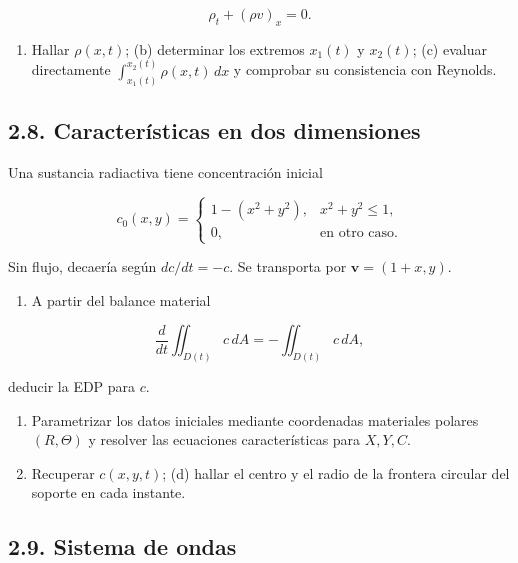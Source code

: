 \documentclass[11pt,a4paper]{article}
\providecommand{\tightlist}{\setlength{\itemsep}{0pt}\setlength{\parskip}{0pt}}
\begin{document}
\[\rho_t+(\rho v)_x=0.\]

\begin{enumerate}
\def\labelenumi{(\alph{enumi})}
\tightlist
\item
  Hallar \(\rho(x,t)\); (b) determinar los extremos \(x_1(t)\) y
  \(x_2(t)\); (c) evaluar directamente
  \(\int_{x_1(t)}^{x_2(t)}\rho(x,t)\,dx\) y comprobar su consistencia
  con Reynolds.
\end{enumerate}

\hypertarget{caracteruxedsticas-en-dos-dimensiones}{%
\subsection{2.8. Características en dos
dimensiones}\label{caracteruxedsticas-en-dos-dimensiones}}

Una sustancia radiactiva tiene concentración inicial

\[c_0(x,y)=\begin{cases}1-(x^2+y^2),&x^2+y^2\le1,\\0,&\text{en otro caso}.\end{cases}\]

Sin flujo, decaería según \(dc/dt=-c\). Se transporta por
\(\mathbf v=(1+x,y)\).

\begin{enumerate}
\def\labelenumi{(\alph{enumi})}
\tightlist
\item
  A partir del balance material
\end{enumerate}

\[\frac{d}{dt}\iint_{D(t)}c\,dA=-\iint_{D(t)}c\,dA,\]

deducir la EDP para \(c\).

\begin{enumerate}
\def\labelenumi{(\alph{enumi})}
\setcounter{enumi}{1}
\item
  Parametrizar los datos iniciales mediante coordenadas materiales
  polares \((R,\Theta)\) y resolver las ecuaciones características para
  \(X,Y,C\).
\item
  Recuperar \(c(x,y,t)\); (d) hallar el centro y el radio de la frontera
  circular del soporte en cada instante.
\end{enumerate}

\hypertarget{sistema-de-ondas}{%
\subsection{2.9. Sistema de ondas}\label{sistema-de-ondas}}
\end{document}
